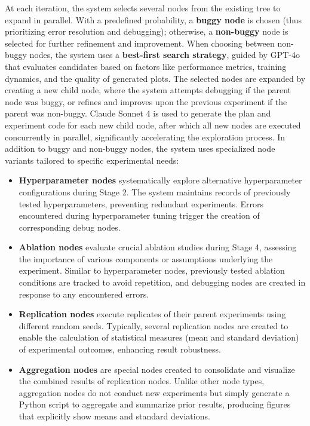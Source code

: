 \begin{itemize}
At each iteration, the system selects several nodes from the existing tree to expand in parallel.
With a predefined probability, a \textbf{buggy node} is chosen (thus prioritizing error resolution and debugging); otherwise, a \textbf{non-buggy} node is selected for further refinement and improvement.
When choosing between non-buggy nodes, the system uses a \textbf{best-first search strategy}, guided by GPT-4o that evaluates candidates based on factors like performance metrics, training dynamics, and the quality of generated plots.
The selected nodes are expanded by creating a new child node, where the system attempts debugging if the parent node was buggy, or refines and improves upon the previous experiment if the parent was non-buggy.
Claude Sonnet 4 is used to generate the plan and experiment code for each new child node, after which all new nodes are executed concurrently in parallel, significantly accelerating the exploration process.
In addition to buggy and non-buggy nodes, the system uses specialized node variants tailored to specific experimental needs:

\begin{itemize}
\item \textbf{Hyperparameter nodes} systematically explore alternative hyperparameter configurations during Stage 2. The system maintains records of previously tested hyperparameters, preventing redundant experiments. Errors encountered during hyperparameter tuning trigger the creation of corresponding debug nodes.
\item \textbf{Ablation nodes} evaluate crucial ablation studies during Stage 4, assessing the importance of various components or assumptions underlying the experiment. Similar to hyperparameter nodes, previously tested ablation conditions are tracked to avoid repetition, and debugging nodes are created in response to any encountered errors.
\item \textbf{Replication nodes} execute replicates of their parent experiments using different random seeds. Typically, several replication nodes are created to enable the calculation of statistical measures (mean and standard deviation) of experimental outcomes, enhancing result robustness.
\item \textbf{Aggregation nodes} are special nodes created to consolidate and visualize the combined results of replication nodes. Unlike other node types, aggregation nodes do not conduct new experiments but simply generate a Python script to aggregate and summarize prior results, producing figures that explicitly show means and standard deviations.
\end{itemize}


\end{itemize}
